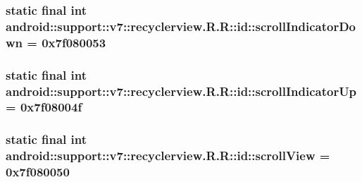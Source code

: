 \hypertarget{classandroid_1_1support_1_1v7_1_1recyclerview_1_1_r_1_1id_fb40c7c0724922537ccd037c52055a3d}{
\subsubsection[{scrollIndicatorDown}]{\setlength{\rightskip}{0pt plus 5cm}static final int android::support::v7::recyclerview.R.R::id::scrollIndicatorDown = 0x7f080053}}
\label{classandroid_1_1support_1_1v7_1_1recyclerview_1_1_r_1_1id_fb40c7c0724922537ccd037c52055a3d}


\hypertarget{classandroid_1_1support_1_1v7_1_1recyclerview_1_1_r_1_1id_d81f8397b176b5c3e488c2d45641efa8}{
\subsubsection[{scrollIndicatorUp}]{\setlength{\rightskip}{0pt plus 5cm}static final int android::support::v7::recyclerview.R.R::id::scrollIndicatorUp = 0x7f08004f}}
\label{classandroid_1_1support_1_1v7_1_1recyclerview_1_1_r_1_1id_d81f8397b176b5c3e488c2d45641efa8}


\hypertarget{classandroid_1_1support_1_1v7_1_1recyclerview_1_1_r_1_1id_71f289c2a440e2828dc7a0e88c47c331}{
\subsubsection[{scrollView}]{\setlength{\rightskip}{0pt plus 5cm}static final int android::support::v7::recyclerview.R.R::id::scrollView = 0x7f080050}}
\label{classandroid_1_1support_1_1v7_1_1recyclerview_1_1_r_1_1id_71f289c2a440e2828dc7a0e88c47c331}


